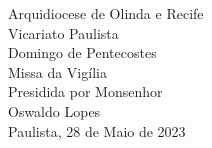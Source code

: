 \begin{center}
    \huge Arquidiocese de Olinda e Recife
    \vspace{.3cm} \\
    \LARGE Vicariato Paulista
    \vspace{3cm} \\
    \textcolor{VioletRed1}{\Huge Domingo de Pentecostes}
    \vspace{3cm} \\
    \huge Missa da Vigília
    \vspace{.3cm} \\
    \LARGE Presidida por Monsenhor
    \vspace{.3cm} \\
    \textcolor{VioletRed1}{\Huge Oswaldo Lopes}
    \vspace{\fill}\\
    \LARGE Paulista, 28 de Maio de 2023
\end{center}
\newpage
